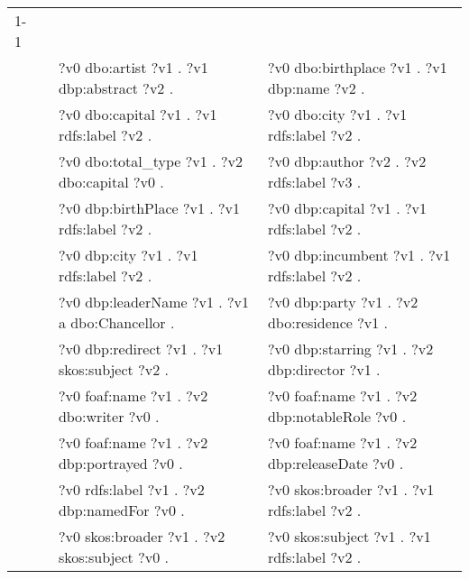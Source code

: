 \begin{table}
{\begin{tabular}{!{\color{white}\vrule}l!{\color{white}\vrule}c@{\hs}!{\color{white}\vrule}p{11.5cm}!{\color{white}\vrule}p{11.5cm}!{\color{white}\vrule}}
			\midrule
			1-1 & \phantom{a} & \\
			 &  \phantom{a} &   ?v0 dbo:artist ?v1 .  ?v1 dbp:abstract ?v2 . &  ?v0 dbo:birthplace ?v1 .  ?v1 dbp:name ?v2 . \\
			 &  \phantom{a} &   ?v0 dbo:capital ?v1 .  ?v1 rdfs:label ?v2 . &  ?v0 dbo:city ?v1 .  ?v1 rdfs:label ?v2 . \\
			 &  \phantom{a} &   ?v0 dbo:total\_type ?v1 .  ?v2 dbo:capital ?v0 . &  ?v0 dbp:author ?v2 .  ?v2 rdfs:label ?v3 . \\
			 &  \phantom{a} &   ?v0 dbp:birthPlace ?v1 .  ?v1 rdfs:label ?v2 . &  ?v0 dbp:capital ?v1 .  ?v1 rdfs:label ?v2 . \\
			 &  \phantom{a} &   ?v0 dbp:city ?v1 .  ?v1 rdfs:label ?v2 . &  ?v0 dbp:incumbent ?v1 .  ?v1 rdfs:label ?v2 . \\
			 &  \phantom{a} &   ?v0 dbp:leaderName ?v1 .  ?v1 a dbo:Chancellor . &  ?v0 dbp:party ?v1 .  ?v2 dbo:residence ?v1 . \\
			 &  \phantom{a} &   ?v0 dbp:redirect ?v1 .  ?v1 skos:subject ?v2 . &  ?v0 dbp:starring ?v1 .  ?v2 dbp:director ?v1 . \\
			 &  \phantom{a} &   ?v0 foaf:name ?v1 .  ?v2 dbo:writer ?v0 . &  ?v0 foaf:name ?v1 .  ?v2 dbp:notableRole ?v0 . \\
			 &  \phantom{a} &   ?v0 foaf:name ?v1 .  ?v2 dbp:portrayed ?v0 . &  ?v0 foaf:name ?v1 .  ?v2 dbp:releaseDate ?v0 . \\
			 &  \phantom{a} &   ?v0 rdfs:label ?v1 .  ?v2 dbp:namedFor ?v0 . &  ?v0 skos:broader ?v1 .  ?v1 rdfs:label ?v2 . \\
			 &  \phantom{a} &   ?v0 skos:broader ?v1 .  ?v2 skos:subject ?v0 . &  ?v0 skos:subject ?v1 .  ?v1 rdfs:label ?v2 . \\


\end{tabular}}
\end{table}

